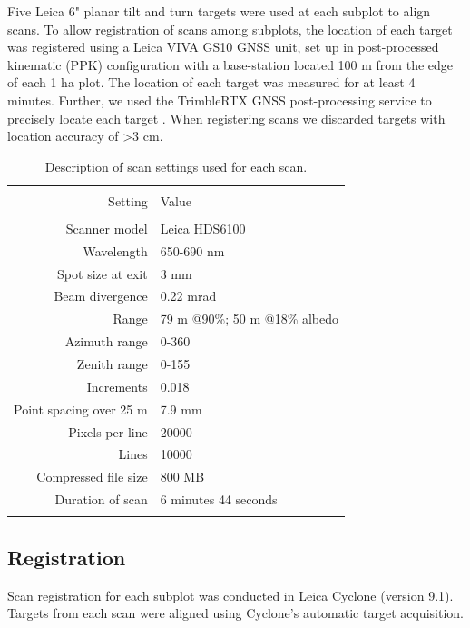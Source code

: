 \documentclass[11pt,a4paper]{article}
\newcommand{\textapprox}{\raisebox{0.5ex}{\texttildelow}}  %
\begin{document}
Five Leica 6" planar tilt and turn targets were used at each subplot to align scans. To allow registration of scans among subplots, the location of each target was registered using a Leica VIVA GS10 GNSS unit, set up in post-processed kinematic (PPK) configuration with a base-station located \textapprox{}100 m from the edge of each 1 ha plot. The location of each target was measured for at least 4 minutes. Further, we used the TrimbleRTX GNSS post-processing service to precisely locate each target \citep{Chen2011}. When registering scans we discarded targets with location accuracy of >3 cm.

\begin{table}[H] \centering 
  \caption{Description of scan settings used for each scan.} 
  \label{scan_settings} 
\begin{tabular}{@{\extracolsep{0pt}} rl} 
\\[-1.8ex]\hline 
\hline \\[-1.8ex] 
{Setting} & {Value} \\
\hline \\[-1.8ex] 
Scanner model & Leica HDS6100 \\
Wavelength & 650-690 nm \\
Spot size at exit & 3 mm \\
Beam divergence & 0.22 mrad \\
Range & 79 m @90\%; 50 m @18\% albedo \\
Azimuth range & 0-360\textdegree{} \\
Zenith range & 0-155\textdegree{} \\
Increments & 0.018\textdegree{} \\
Point spacing over 25 m & 7.9 mm \\
Pixels per line & 20000 \\
Lines & 10000 \\
Compressed file size & \textapprox{}800 MB \\
Duration of scan & 6 minutes 44 seconds \\
\hline
\hline \\[-1.8ex] 
\end{tabular} 
\end{table} 

\subsection{Registration}

Scan registration for each subplot was conducted in Leica Cyclone (version 9.1). Targets from each scan were aligned using Cyclone's automatic target acquisition. 
\end{document}
